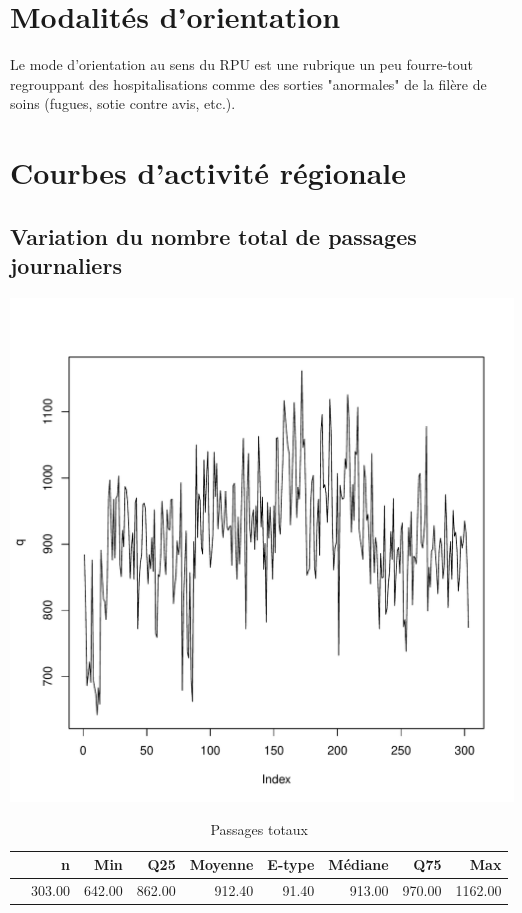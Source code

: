 \documentclass[12pt,english,french,twoside]{report}\usepackage[]{graphicx}\usepackage[]{color}
\makeatletter
\def\maxwidth{ %
  \ifdim\Gin@nat@width>\linewidth
    \linewidth
  \else
    \Gin@nat@width
  \fi
}
\makeatother
\begin{document}
\newpage
\chapter{Modalités d'orientation}



Le mode d'orientation au sens du RPU est une rubrique un peu fourre-tout regrouppant des hospitalisations comme des sorties "anormales" de la filère de soins (fugues, sotie contre avis, etc.).


\newpage
\chapter{Courbes d'activité régionale}

 

\section{Variation du nombre total de passages journaliers}


\includegraphics[width=\maxwidth]{figure/passages_totaux1} 
\begin{table}[ht]
\centering
\begin{tabular}{rrrrrrrrr}
  \hline
 & n & Min & Q25 & Moyenne & E-type & Médiane & Q75 & Max \\ 
  \hline
 & 303.00 & 642.00 & 862.00 & 912.40 & 91.40 & 913.00 & 970.00 & 1162.00 \\ 
   \hline
\end{tabular}
\caption[Passages totaux]{Passages totaux} 
\label{tab:pt}
\end{table}
\end{document}
